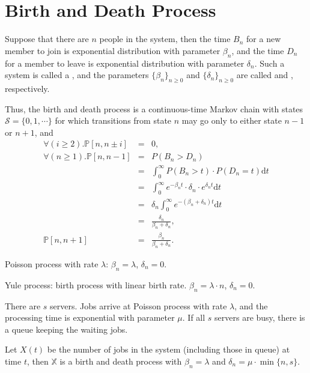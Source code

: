 \section{Birth and Death Process}

\begin{definition}
Suppose that there are $ n $ people in the system, then the time $ B_{n} $ for a new member to join is exponential distribution with parameter $ \beta_{n} $, and the time $ D_{n} $ for a member to leave is exponential distribution with parameter $ \delta_{n} $. Such a system is called a , and the parameters $ \{ \beta_{n} \}_{n \ge 0} $ and $ \{ \delta_{n} \}_{n \ge 0} $ are called  and , respectively.

Thus, the birth and death process is a continuous-time Markov chain with states $ \mathcal{S} = \{ 0, 1, \cdots \} $ for which transitions from state $ n $ may go only to either state $ n - 1 $ or $ n + 1 $, and
\begin{eqnarray*}
\forall(i \ge 2). \mathbb{P}[n, n \pm i] & = & 0, \\
\forall(n \ge 1). \mathbb{P}[n, n - 1]
    & = & P(B_{n} > D_{n}) \\
    & = & \int_{0}^{\infty} P(B_{n} > t) \cdot P(D_{n} = t) \mathrm{d}t \\
    & = & \int_{0}^{\infty} e^{-\beta_{n}t} \cdot \delta_{n} \cdot e^{\delta_{n}t} \mathrm{d}t \\
    & = & \delta_{n} \int_{0}^{\infty} e^{-(\beta_{n} + \delta_{n})t} \mathrm{d}t \\
    & = & \frac{\delta_{n}}{\beta_{n} + \delta_{n}}, \\
\mathbb{P}[n, n + 1] & = & \frac{\beta_{n}}{\beta_{n} + \delta_{n}}.
\end{eqnarray*}
\end{definition}

\begin{example}
Poisson process with rate $ \lambda $: $ \beta_{n} = \lambda $, $ \delta_{n} = 0 $.
\end{example}

\begin{example}
Yule process: birth process with linear birth rate. $ \beta_{n} = \lambda \cdot n $, $ \delta_{n} = 0 $.
\end{example}

\begin{example}
There are $ s $ servers. Jobs arrive at Poisson process with rate $ \lambda $, and the processing time is exponential with parameter $ \mu $. If all $ s $ servers are busy, there is a queue keeping the waiting jobs.

Let $ X(t) $ be the number of jobs in the system (including those in queue) at time $ t $, then $ \mathbb{X} $ is a birth and death process with $ \beta_{n} = \lambda $ and $ \delta_{n} = \mu \cdot \min \{n, s\} $.
\end{example}

